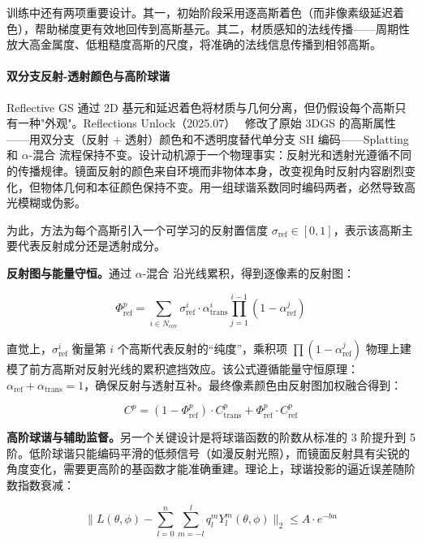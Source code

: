 训练中还有两项重要设计。其一，初始阶段采用逐高斯着色（而非像素级延迟着色），帮助梯度更有效地回传到高斯基元。其二，材质感知的法线传播——周期性放大高金属度、低粗糙度高斯的尺度，将准确的法线信息传播到相邻高斯。

\paragraph{双分支反射-透射颜色与高阶球谐}

Reflective GS 通过 2D 基元和延迟着色将材质与几何分离，但仍假设每个高斯只有一种"外观"。Reflections Unlock（2025.07）~\cite{2507_06103} 修改了原始 3DGS 的高斯属性——用双分支（反射 + 透射）颜色和不透明度替代单分支 SH 编码——Splatting 和 $\alpha$-混合 流程保持不变。设计动机源于一个物理事实：反射光和透射光遵循不同的传播规律。镜面反射的颜色来自环境而非物体本身，改变视角时反射内容剧烈变化，但物体几何和本征颜色保持不变。用一组球谐系数同时编码两者，必然导致高光模糊或伪影。

为此，方法为每个高斯引入一个可学习的反射置信度 $\sigma_{\text{ref}} \in [0,1]$，表示该高斯主要代表反射成分还是透射成分。

\textbf{反射图与能量守恒。}通过 $\alpha$-混合 沿光线累积，得到逐像素的反射图：

\begin{equation}
\Phi_{\text{ref}}^p = \sum_{i \in N_{\text{cov}}} \sigma_{\text{ref}}^i \cdot \alpha_{\text{trans}}^i \prod_{j=1}^{i-1}(1 - \alpha_{\text{ref}}^j)
\end{equation}

直觉上，$\sigma_{\text{ref}}^i$ 衡量第 $i$ 个高斯代表反射的``纯度''，乘积项 $\prod(1-\alpha_{\text{ref}}^j)$ 物理上建模了前方高斯对反射光线的累积遮挡效应。该公式遵循能量守恒原理：$\alpha_{\text{ref}} + \alpha_{\text{trans}} = 1$，确保反射与透射互补。最终像素颜色由反射图加权融合得到：

\begin{equation}
C^p = (1 - \Phi_{\text{ref}}^p) \cdot C_{\text{trans}}^p + \Phi_{\text{ref}}^p \cdot C_{\text{ref}}^p
\end{equation}

\textbf{高阶球谐与辅助监督。}另一个关键设计是将球谐函数的阶数从标准的 3 阶提升到 5 阶。低阶球谐只能编码平滑的低频信号（如漫反射光照），而镜面反射具有尖锐的角度变化，需要更高阶的基函数才能准确重建。理论上，球谐投影的逼近误差随阶数指数衰减：

\begin{equation}
\|L(\theta, \phi) - \sum_{l=0}^{n}\sum_{m=-l}^{l} q_l^m Y_l^m(\theta, \phi)\|_2 \leq A \cdot e^{-bn}
\end{equation}

